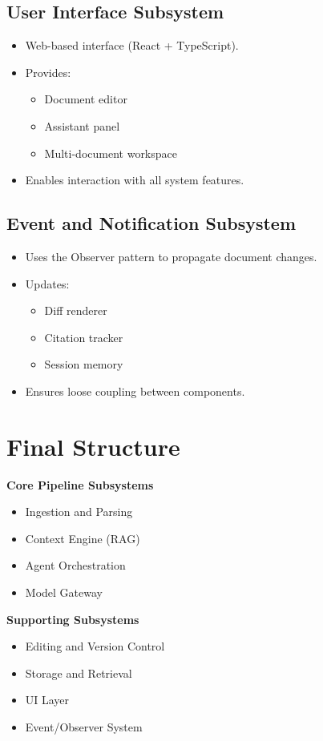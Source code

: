 \documentclass[12pt]{article}
\begin{document}
\subsection{User Interface Subsystem}
\begin{itemize}
   \item Web-based interface (React + TypeScript).
   \item Provides:
   \begin{itemize}
      \item Document editor
      \item Assistant panel
      \item Multi-document workspace
   \end{itemize}
   \item Enables interaction with all system features.
\end{itemize}

\subsection{Event and Notification Subsystem}
\begin{itemize}
   \item Uses the Observer pattern to propagate document changes.
   \item Updates:
   \begin{itemize}
      \item Diff renderer
      \item Citation tracker
      \item Session memory
   \end{itemize}
   \item Ensures loose coupling between components.
\end{itemize}

\section*{Final Structure}

\textbf{Core Pipeline Subsystems}
\begin{itemize}
   \item Ingestion and Parsing
   \item Context Engine (RAG)
   \item Agent Orchestration
   \item Model Gateway
\end{itemize}

\textbf{Supporting Subsystems}
\begin{itemize}
   \item Editing and Version Control
   \item Storage and Retrieval
   \item UI Layer
   \item Event/Observer System
\end{itemize}
\end{document}
